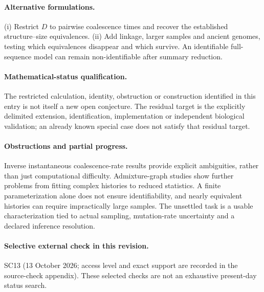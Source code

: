 \documentclass[11pt]{article}
\begin{document}
\paragraph{Alternative formulations.} (i) Restrict $D$ to pairwise coalescence times and recover the established structure--size equivalences. (ii) Add linkage, larger samples and ancient genomes, testing which equivalences disappear and which survive. An identifiable full-sequence model can remain non-identifiable after summary reduction.
\paragraph{Mathematical-status qualification.} The restricted calculation, identity, obstruction or construction identified in this entry is not itself a new open conjecture. The residual target is the explicitly delimited extension, identification, implementation or independent biological validation; an already known special case does not satisfy that residual target.

\paragraph{Obstructions and partial progress.} Inverse instantaneous coalescence-rate results provide explicit ambiguities, rather than just computational difficulty. Admixture-graph studies show further problems from fitting complex histories to reduced statistics. A finite parameterization alone does not ensure identifiability, and nearly equivalent histories can require impractically large samples. The unsettled task is a usable characterization tied to actual sampling, mutation-rate uncertainty and a declared inference resolution.
\paragraph{Selective external check in this revision.} SC13 (13 October 2026; access level and exact support are recorded in the source-check appendix). These selected checks are not an exhaustive present-day status search.
\end{document}
